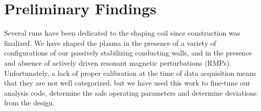 \documentclass[aps,prl,twocolumn,superscriptaddress,groupedaddress]{revtex4}  %
\begin{document}

\section{Preliminary Findings}
	Several runs have been dedicated to the shaping coil since construction was finalized.  We have shaped the plasma in the presence of a variety of configurations of our passively stabilizing conducting walls, and in the presence and absence of actively driven resonant magnetic perturbations (RMPs).   Unfortunately, a lack of proper calibration at the time of data acquisition means that they are not well categorized, but we have used this work to fine-tune our analysis code, determine the safe operating parameters and determine deviations from the design. \par 
		
\end{document}
